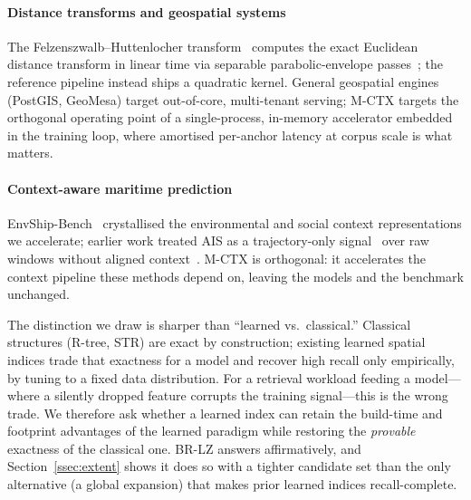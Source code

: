 \paragraph*{Distance transforms and geospatial systems}
The Felzenszwalb--Huttenlocher transform~\cite{felzenszwalb2004distance}
computes the exact Euclidean distance transform in linear time via
separable parabolic-envelope passes~\cite{virtanen2020scipy}; the
reference pipeline instead ships a quadratic kernel. General geospatial
engines (PostGIS, GeoMesa) target out-of-core, multi-tenant serving;
M-CTX targets the orthogonal operating point of a single-process,
in-memory accelerator embedded in the training loop, where amortised
per-anchor latency at corpus scale is what matters.

\paragraph*{Context-aware maritime prediction}
EnvShip-Bench~\cite{envshipbench2026} crystallised the environmental and
social context representations we accelerate; earlier work treated AIS as
a trajectory-only signal~\cite{nguyen2018traisformer,zhao2021bilstm} over
raw windows without aligned context~\cite{dma2025pilot}. M-CTX is
orthogonal: it accelerates the context pipeline these methods depend on,
leaving the models and the benchmark unchanged.

\noindent The distinction we draw is sharper than ``learned vs.\
classical.'' Classical structures (R-tree, STR) are exact by
construction; existing learned spatial indices trade that exactness for a
model and recover high recall only empirically, by tuning to a fixed data
distribution. For a retrieval workload feeding a model---where a silently
dropped feature corrupts the training signal---this is the wrong trade. We
therefore ask whether a learned index can retain the build-time and
footprint advantages of the learned paradigm while restoring the
\emph{provable} exactness of the classical one. BR-LZ answers
affirmatively, and Section~\ref{ssec:extent} shows it does so with a
tighter candidate set than the only alternative (a global expansion) that
makes prior learned indices recall-complete.

